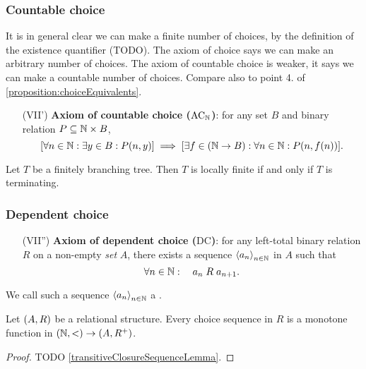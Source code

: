 \subsubsection{Countable choice}
It is in general clear we can make a finite number of choices, by the definition of the existence quantifier (TODO). The axiom of choice says we can make an arbitrary number of choices. The axiom of countable choice is weaker, it says we can make a countable number of choices. Compare also to point 4. of \ref{proposition:choiceEquivalents}.
\begin{enumerate}[(I)]
\setcounter{enumi}{6}
\item[(VII')] \textbf{Axiom of countable choice ($\text{AC}_{\mathbb{N}}$)}: for any set $B$ and binary relation $P\subseteq \mathbb{N}\times B$,
\[ [\forall n\in \mathbb{N}: \exists y\in B: P(n,y)] \implies [\exists f\in (\mathbb{N}\to B): \forall n \in \mathbb{N}: P(n,f(n))]. \]
\end{enumerate}

\begin{theorem}
Let $T$ be a finitely branching tree. Then $T$ is locally finite \textup{if and only if} $T$ is terminating.
\end{theorem}

\subsubsection{Dependent choice}
\begin{enumerate}[(I)]
\setcounter{enumi}{6}
\item[(VII'')] \textbf{Axiom of dependent choice ($\text{DC}$)}: for any left-total binary relation $R$ on a non-empty \emph{set} $A$, there exists a sequence $\left\langle a_n \right\rangle_{n\in \mathbb{N}}$ in $A$ such that
\[ \forall n\in \mathbb{N}: \quad a_n\mathrel{R}a_{n+1}. \]
\end{enumerate}

\begin{definition}
We call such a sequence $\left\langle a_n \right\rangle_{n\in \mathbb{N}}$ a .
\end{definition}

\begin{lemma} \label{choiceSequenceMonotone}
Let $\left( A, R \right)$ be a relational structure. Every choice sequence in $R$ is a monotone function in $\left( \mathbb{N}, < \right) \to \left( A, R^+ \right)$.
\end{lemma}
\begin{proof}
TODO \ref{transitiveClosureSequenceLemma}.
\end{proof}

